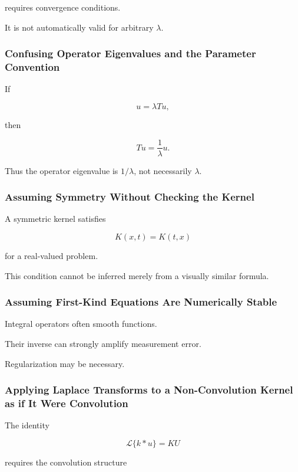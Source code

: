 requires convergence conditions.

It is not automatically valid for arbitrary \(\lambda\).

\subsubsection{Confusing Operator Eigenvalues and the Parameter Convention}

If

\[
u=\lambda Tu,
\]

then

\[
Tu
=
\frac1\lambda u.
\]

Thus the operator eigenvalue is \(1/\lambda\), not necessarily
\(\lambda\).

\subsubsection{Assuming Symmetry Without Checking the Kernel}

A symmetric kernel satisfies

\[
\boxed{
K(x,t)=K(t,x)
}
\]

for a real-valued problem.

This condition cannot be inferred merely from a visually similar formula.

\subsubsection{Assuming First-Kind Equations Are Numerically Stable}

Integral operators often smooth functions.

Their inverse can strongly amplify measurement error.

Regularization may be necessary.

\subsubsection{Applying Laplace Transforms to a Non-Convolution Kernel as if It Were Convolution}

The identity

\[
\mathcal{L}\{k*u\}
=
KU
\]

requires the convolution structure

